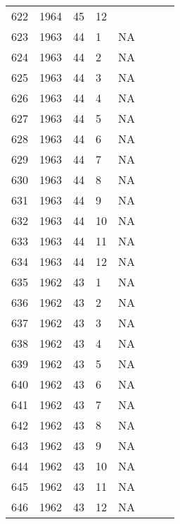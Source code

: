 \begin{longtable}{ |l|l|l|l|l|l|l|l| }
622 & 1964 & 45 &    12 &         &                &  & \\
623 & 1963 & 44 &     1 &      NA &                &  & \\
624 & 1963 & 44 &     2 &      NA &                &  & \\
625 & 1963 & 44 &     3 &      NA &                &  & \\
626 & 1963 & 44 &     4 &      NA &                &  & \\
627 & 1963 & 44 &     5 &      NA &                &  & \\
628 & 1963 & 44 &     6 &      NA &                &  & \\
629 & 1963 & 44 &     7 &      NA &                &  & \\
630 & 1963 & 44 &     8 &      NA &                &  & \\
631 & 1963 & 44 &     9 &      NA &                &  & \\
632 & 1963 & 44 &    10 &      NA &                &  & \\
633 & 1963 & 44 &    11 &      NA &                &  & \\
634 & 1963 & 44 &    12 &      NA &                &  & \\
635 & 1962 & 43 &     1 &      NA &                &  & \\
636 & 1962 & 43 &     2 &      NA &                &  & \\
637 & 1962 & 43 &     3 &      NA &                &  & \\
638 & 1962 & 43 &     4 &      NA &                &  & \\
639 & 1962 & 43 &     5 &      NA &                &  & \\
640 & 1962 & 43 &     6 &      NA &                &  & \\
641 & 1962 & 43 &     7 &      NA &                &   & \\
642 & 1962 & 43 &     8 &      NA &                &  & \\
643 & 1962 & 43 &     9 &      NA &                &  & \\
644 & 1962 & 43 &    10 &      NA &                &  & \\
645 & 1962 & 43 &    11 &      NA &                &  & \\
646 & 1962 & 43 &    12 &      NA &                &  & \\
\end{longtable}
